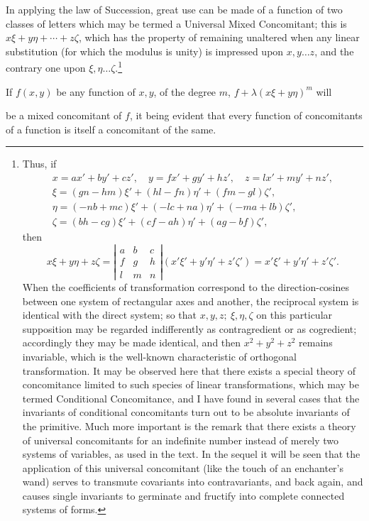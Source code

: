 \documentclass[11pt]{article}
\newcommand{\sourcepage}[1]{\marginpar{\scriptsize p.~#1}}
\begin{document}
{{In applying the law of Succession, great use can be made of a function of two classes of letters which may be termed a Universal Mixed Concomitant; this is $x\xi+y\eta+\cdots+z\zeta$, which has the property of remaining unaltered when any linear substitution (for which the modulus is unity) is impressed upon $x,y\ldots z$, and the contrary one upon $\xi,\eta\ldots\zeta$.\footnote{Thus, if
\[
\begin{gathered}
x=ax'+by'+cz',\quad y=fx'+gy'+hz',\quad z=lx'+my'+nz',\\
\xi=(gn-hm)\xi'+(hl-fn)\eta'+(fm-gl)\zeta',\\
\eta=(-nb+mc)\xi'+(-lc+na)\eta'+(-ma+lb)\zeta',\\
\zeta=(bh-cg)\xi'+(cf-ah)\eta'+(ag-bf)\zeta',
\end{gathered}
\]
then
\[
x\xi+y\eta+z\zeta=\left|\begin{array}{ccc}a&b&c\\ f&g&h\\ l&m&n\end{array}\right|(x'\xi'+y'\eta'+z'\zeta')=x'\xi'+y'\eta'+z'\zeta'.
\]
When the coefficients of transformation correspond to the direction-cosines between one system of rectangular axes and another, the reciprocal system is identical with the direct system; so that $x,y,z;\ \xi,\eta,\zeta$ on this particular supposition may be regarded indifferently as contragredient or as cogredient; accordingly they may be made identical, and then $x^2+y^2+z^2$ remains invariable, which is the well-known characteristic of orthogonal transformation. It may be observed here that there exists a special theory of concomitance limited to such species of linear transformations, which may be termed Conditional Concomitance, and I have found in several cases that the invariants of conditional concomitants turn out to be absolute invariants of the primitive. Much more important is the remark that there exists a theory of universal concomitants for an indefinite number instead of merely two systems of variables, as used in the text. In the sequel it will be seen that the application of this universal concomitant (like the touch of an enchanter's wand) serves to transmute covariants into contravariants, and back again, and causes single invariants to germinate and fructify into complete connected systems of forms.}

If $f(x,y)$ be any function of $x,y$, of the degree $m$, $f+\lambda(x\xi+y\eta)^m$ will

\sourcepage{289}
be a mixed concomitant of $f$, it being evident that every function of concomitants of a function is itself a concomitant of the same.

}}
\end{document}

